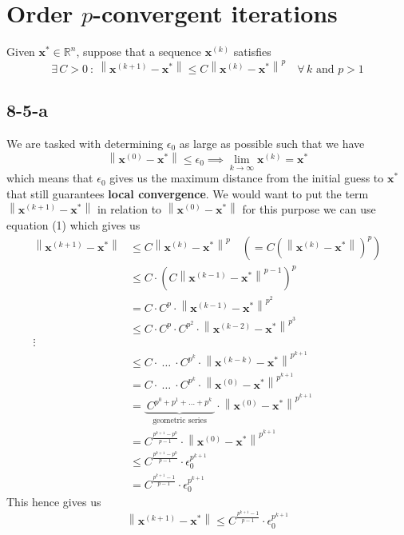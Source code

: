 \documentclass{article}
\newcommand\xk{\mathbf{x}^{\left(k\right)}}
\newcommand\xkn{\mathbf{x}^{\left(k+1\right)}}
\newcommand\xstar{\mathbf{x}^{*}}
\newcommand\xz{\mathbf{x}^{\left(0\right)}}
\begin{document}
\section*{Order $p$-convergent iterations}
Given $\xstar \in \mathbb{R}^{n}$, suppose that a sequence $\xk$ satisfies 
\begin{equation}
    \exists\,C > 0\::\: \left\lVert \xkn - \xstar \right\rVert \leq C\left\lVert \xk - \xstar\right\rVert^{p} \quad \forall\, k \text{ and } p > 1
\end{equation}
\subsection*{8-5-a}
We are tasked with determining $\epsilon_{0}$ as large as possible such that we have
\begin{equation*}
    \left\lVert  \xz -\xstar\right\rVert \leq \epsilon_{0} \implies \lim_{k \to \infty}\xk = \xstar
\end{equation*}
which means that $\epsilon_{0}$ gives us the maximum distance from the initial guess to $\xstar$ that still guarantees \textbf{local convergence}. We would want to put the term $\left\lVert \xkn - \xstar \right\rVert$ in relation to $ \left\lVert  \xz -\xstar\right\rVert$ for this purpose we can use equation (1) which gives us
\begin{align*}
    \left\lVert \xkn - \xstar \right\rVert  &\leq C\left\lVert \xk - \xstar\right\rVert^{p} \quad\left(=C\left(\left\lVert \xk - \xstar\right\rVert\right)^{p}\right) \\
    &\leq C \cdot \left(C \left\lVert \mathbf{x}^{\left(k-1\right)} - \xstar\right\rVert^{p-1}\right)^{p} \\
    &= C\cdot C^{p}\cdot\left\lVert  \mathbf{x}^{\left(k-1\right)}- \xstar\right\rVert^{p^{2}} \\
    &\leq C\cdot C^{p}\cdot C^{p^{2}}\cdot\left\lVert \mathbf{x}^{\left(k-2\right)} - \xstar\right\rVert^{p^{3}} \\
    \vdots \\
    &\leq C \cdot \: \dots \: \cdot C^{p^{k}} \cdot\left\lVert \mathbf{x}^{\left(k-k\right)} - \xstar \right\rVert^{p^{k+1}} \\
    &= C \cdot \: \dots \: \cdot C^{p^{k}}\cdot\left\lVert \mathbf{x}^{\left(0\right)} - \xstar \right\rVert^{p^{k+1}} \\
    &= \underbrace{\:C^{p^{0} + p^{1}+\dots +p^{k}}\:}_{\text{geometric series}}\cdot\left\lVert \mathbf{x}^{\left(0\right)} - \xstar \right\rVert^{p^{k+1}} \\
    &= C^{\frac{p^{k+1}-p^{0}}{p-1}} \cdot\left\lVert \mathbf{x}^{\left(0\right)} - \xstar \right\rVert^{p^{k+1}} \\
    &\leq C^{\frac{p^{k+1}-p^{0}}{p-1}} \cdot \epsilon_{0}^{p^{k+1}} \\
    &= C^{\frac{p^{k+1}-1}{p-1}} \cdot \epsilon_{0}^{p^{k+1}}
\end{align*}
This hence gives us
\begin{equation*}
    \left\lVert \xkn - \xstar \right\rVert   \leq C^{\frac{p^{k+1}-1}{p-1}} \cdot \epsilon_{0}^{p^{k+1}}
\end{equation*}
\end{document}
